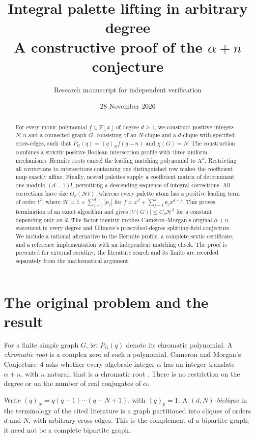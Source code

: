 \documentclass[11pt,a4paper]{article}
\title{\color{ink}\bfseries Integral palette lifting in arbitrary degree\\[3pt]
\large A constructive proof of the \texorpdfstring{$\alpha+n$}{alpha+n} conjecture}
\author{\normalsize Research manuscript for independent verification}
\date{28 November 2026}
\theoremstyle{definition}
\newcommand{\Z}{\mathbb Z}
\newcommand{\fall}[2]{(#1)_{#2}}
\newcommand{\htf}{\mathcal H}
\begin{document}
\maketitle
\begin{abstract}
For every monic polynomial $f\in\Z[x]$ of degree $d\ge1$, we construct
positive integers $N,n$ and a connected graph $G$, consisting of an
$N$-clique and a $d$-clique with specified cross-edges, such that
$P_G(q)=\fall qN f(q-n)$ and $\chi(G)=N$.
The construction combines a strictly positive Boolean intersection profile
with three uniform mechanisms. Hermite roots cancel the leading matching
polynomial to $X^d$. Restricting all corrections to intersections containing
one distinguished row makes the coefficient map exactly affine. Finally,
nested palettes supply a coefficient matrix of determinant one modulo
$(d-1)!$, permitting a descending sequence of integral corrections.
All corrections have size $O_d(\htf t)$, whereas every palette atom has a
positive leading term of order $t^2$, where
$\htf=1+\sum_{j=1}^d|a_j|$ for $f=x^d+\sum_{j=1}^d a_jx^{d-j}$.
This proves termination of an exact algorithm and gives
$|V(G)|\le C_d\htf^2$ for a constant depending only on $d$.
The factor identity implies Cameron--Morgan's original $\alpha+n$
statement in every degree and Gilmore's prescribed-degree splitting-field
conjecture. We include a rational alternative to the Hermite profile,
a complete sextic certificate, and a reference implementation with an
independent matching check. The proof is presented for external scrutiny;
the literature search and its limits are recorded separately from the
mathematical argument.
\end{abstract}

\section{The original problem and the result}

For a finite simple graph $G$, let $P_G(q)$ denote its chromatic polynomial.
A \emph{chromatic root} is a complex zero of such a polynomial.
Cameron and Morgan's Conjecture~4 asks whether every algebraic integer
$\alpha$ has an integer translate $\alpha+n$, with $n$ natural, that is a
chromatic root \cite{CM}. There is no restriction on the degree or on the
number of real conjugates of $\alpha$.

Write $\fall qN=q(q-1)\cdots(q-N+1)$, with $\fall q0=1$.
A \emph{$(d,N)$-biclique} in the terminology of the cited literature is
a graph partitioned into cliques of orders $d$ and $N$, with arbitrary
cross-edges. This is the complement of a bipartite graph; it need not be a
complete bipartite graph.
\end{document}
